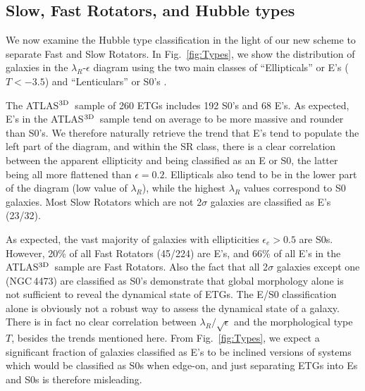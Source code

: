 \documentclass[useAMS,usenatbib,usegraphicx]{mn2e}
\newcommand{\atlas}{{ATLAS$^{\rm 3D}$}}
\begin{document}
\subsection{Slow, Fast Rotators, and Hubble types}
\label{sec:Hubble}

We now examine the Hubble type classification in the light of our new scheme 
to separate Fast and Slow Rotators. 
In Fig.~\ref{fig:Types}, we show the distribution of galaxies in the
$\lambda_R$-$\epsilon$ diagram using the two main classes of
``Ellipticals'' or E's ($T < -3.5$) and ``Lenticulars'' or S0's 
\citep[$T \geq -3.5$, as defined in][]{Paturel+03}. 

The \atlas\ sample of 260 ETGs includes 192 S0's and 68 E's. As expected,
E's in the \atlas\ sample tend on average to be more massive and rounder than S0's.
We therefore naturally retrieve the trend that E's tend to populate the left
part of the diagram, and within the SR class, there is a clear
correlation between the apparent ellipticity and being classified as an E or S0,
the latter being all more flattened than $\epsilon = 0.2$.
Ellipticals also tend to be in the lower part of the diagram
(low value of $\lambda_R$), while the highest
$\lambda_R$ values correspond to S0 galaxies. Most Slow Rotators which are not
2$\sigma$ galaxies are classified as E's (23/32). 

As expected, the vast majority of galaxies with ellipticities ${\epsilon}_{e} > 0.5$ are S0s. 
However, 20\% of all Fast Rotators (45/224) are E's, and 66\% of all E's in the
\atlas\ sample are Fast Rotators. 
Also the fact that all 2$\sigma$ galaxies except one (NGC\,4473) are classified as S0's
demonstrate that global morphology alone is not sufficient to reveal the dynamical state of ETGs.
The E/S0 classification alone is obviously not a robust way to assess the dynamical state of a galaxy. 
There is in fact no clear correlation between ${\lambda_R} / \sqrt{\epsilon}$ and the morphological type $T$, 
besides the trends mentioned here. 
From Fig.~\ref{fig:Types}, we expect a significant fraction of galaxies classified
as E's to be inclined versions of systems which would be classified as S0s when
edge-on, and just separating ETGs into Es and S0s is therefore misleading.
\end{document}
